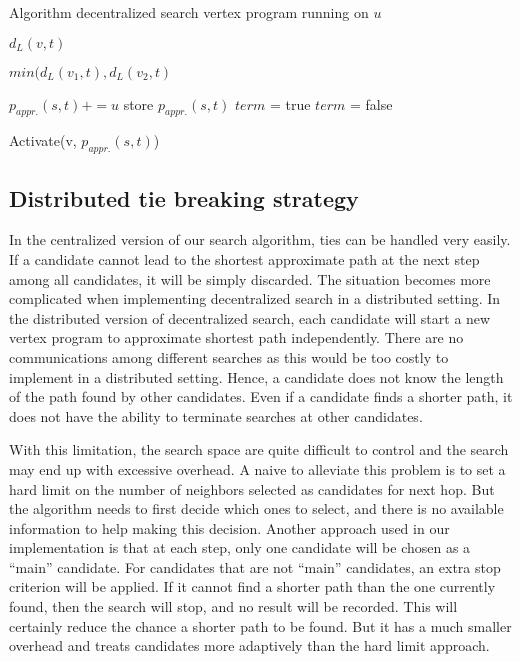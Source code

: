 \begin{algorithm}
    \caption{Algorithm decentralized search vertex program running on $u$}
		\label{alg:vc_dec}
    \begin{algorithmic}
        \State \Return $d_L(v, t)$
        \EndFunction

        \State \Return $min(d_L(v_1,t), d_L(v_2,t)$
        \EndFunction

        \State $p_{appr.}(s,t) += u$
            \State store $p_{appr.}(s,t)$
            \State $term$ = true
        \Else
            \State $term$ = false
        \EndIf
        \EndFunction

            \State Activate(v, $p_{appr.}(s,t)$)
        \EndIf
        \EndFunction
    \end{algorithmic}
\end{algorithm}

\subsection{Distributed tie breaking strategy}

In the centralized version of our search algorithm, ties can be handled very easily. If a candidate cannot lead to the shortest approximate path at the next step among all candidates, it will be simply discarded. The situation becomes more complicated when implementing decentralized search in a distributed setting. In the distributed version of decentralized search, each candidate will start a new vertex program to approximate shortest path independently. There are no communications among different searches as this would be too costly to implement in a distributed setting. Hence, a candidate does not know the length of the path found by other candidates. Even if a candidate finds a shorter path, it does not have the ability to terminate searches at other candidates.

With this limitation, the search space are quite difficult to control and the search may end up with excessive overhead. A naive to alleviate this problem is to set a hard limit on the number of neighbors selected as candidates for next hop. But the algorithm needs to first decide which ones to select, and there is no available information to help making this decision. Another approach used in our implementation is that at each step, only one candidate will be chosen as a ``main'' candidate. For candidates that are not ``main'' candidates, an extra stop criterion will be applied. If it cannot find a shorter path than the one currently found, then the search will stop, and no result will be recorded. This will certainly reduce the chance a shorter path to be found. But it has a much smaller overhead and treats candidates more adaptively than the hard limit approach.